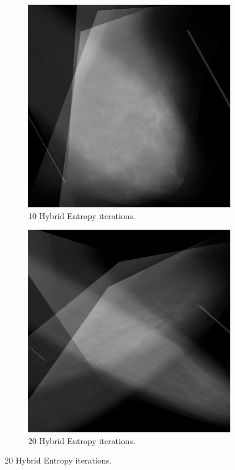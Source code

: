 \begin{figure}[H]
\begin{subfigure}[t]{0.3\textwidth}
        \includegraphics[width=\textwidth]{Appendix5/sample1/hybrid/hybrid-10.png}
        \caption{10 Hybrid Entropy iterations.}
        \label{fig:app-10-hybrid-sample1}
    \end{subfigure} \hfill
    \begin{subfigure}[t]{0.3\textwidth}
      \includegraphics[width=\textwidth]{Appendix5/sample1/hybrid/hybrid20.png}
      \caption{20 Hybrid Entropy iterations.}
      \label{fig:app-20-hybrid-sample1}
    \end{subfigure}
\end{figure}

